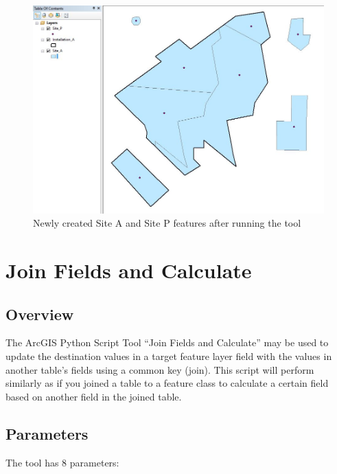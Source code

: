 \documentclass[openany]{book}
\theoremstyle{definition}
\theoremstyle{definition}
\theoremstyle{definition}
\theoremstyle{remark}
\begin{document}
\begin{figure}[H]

{\centering \includegraphics{figures/csd-after} 

}

\caption{Newly created Site A and Site P features after running the tool}\label{fig:csdafter}
\end{figure}

\hypertarget{joinCalc}{\chapter{Join Fields and
Calculate}\label{joinCalc}}

\section{Overview}\label{overview-1}

The ArcGIS Python Script Tool ``Join Fields and Calculate'' may be used
to update the destination values in a target feature layer field with
the values in another table's fields using a common key (join). This
script will perform similarly as if you joined a table to a feature
class to calculate a certain field based on another field in the joined
table.

\section{Parameters}\label{parameters-1}

The tool has 8 parameters:
\end{document}

